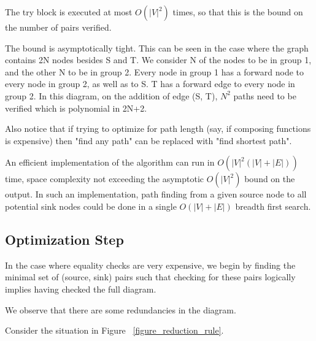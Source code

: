 \documentclass[sigplan,review,anonymous]{acmart}
\begin{document}
{The try block is executed at most $O(|V|^2)$ times, so that this is the bound on the number of pairs verified.

The bound is asymptotically tight. This can be seen in the case where the graph contains 2N nodes besides S and T. We consider N of the nodes to be in group 1, and the other N to be in group 2. Every node in group 1 has a forward node to every node in group 2, as well as to S. T has a forward edge to every node in group 2. In this diagram, on the addition of edge (S, T), $N^2$ paths need to be verified which is polynomial in 2N+2.

Also notice that if trying to optimize for path length (say, if composing functions is expensive) then "find any path" can be replaced with "find shortest path".

An efficient implementation of the algorithm can run in $O(|V|^2(|V|+|E|))$ time, space complexity not exceeding the asymptotic $O(|V|^2)$ bound on the output.
In such an implementation, path finding from a given source node to all potential sink nodes could be done in a single $O(|V|+|E|)$ breadth first search.

\subsection{Optimization Step}

In the case where equality checks are very expensive, we begin by finding the minimal set of (source, sink) pairs such that checking for these pairs logically implies having checked the full diagram.

We observe that there are some redundancies in the diagram.

Consider the situation in Figure ~\ref{figure_reduction_rule}.

}
\end{document}
